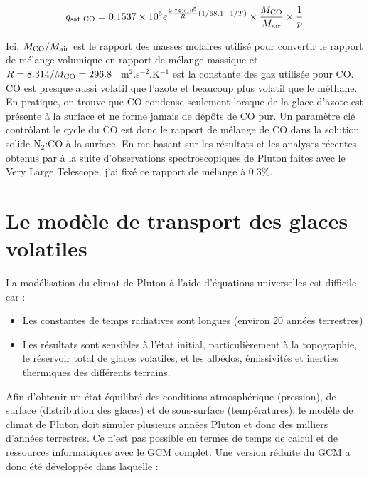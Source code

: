 \begin{equation}
\label{eq:cosat}
q_{\mbox{\scriptsize sat CO}} = 0.1537 \times 10^{5}  
e^{{\frac{2.74 \times 10^{5}}{R}} 
\left(  {1}/{68.1} -{1}/{T} \right) } 
\times \frac{M_{\mbox{\scriptsize CO}}}{M_{\mbox{\scriptsize air}}} \times \frac{1}{p}
\end{equation}

Ici, ${M_{\mbox{\scriptsize CO}}}/{M_{\mbox{\scriptsize air}}}$ est le rapport des masses molaires utilisé pour convertir le rapport de mélange volumique en rapport de mélange massique et $R = 8.314/M_{\mbox{\scriptsize CO}} = 296.8~$~m$^2$.s$^{-2}$.K$^{-1}$ est la constante des gaz utilisée pour CO. 
CO est presque aussi volatil que l’azote et beaucoup plus volatil que le méthane. En pratique, on trouve que CO condense seulement lorsque de la glace d’azote est présente à la surface et ne forme jamais de dépôts de CO pur. 
Un paramètre clé contrôlant le cycle du CO est donc le rapport de mélange de CO dans la solution solide N$_2$:CO à la surface. En me basant sur les résultats et les analyses récentes obtenus par \citet{Merl:15} à la suite d’observations spectroscopiques de Pluton faites avec le Very Large Telescope, j'ai fixé ce rapport de mélange à 0.3\%. 

\section{Le modèle de transport des glaces volatiles}
\label{sc:dev2}

La modélisation du climat de Pluton à l’aide d’équations universelles est difficile car :

\begin{itemize}
\item Les constantes de temps radiatives sont longues (environ 20 années terrestres)
\item Les résultats sont sensibles à l’état initial, particulièrement à la topographie, le réservoir total de glaces volatiles, et les albédos, émissivités et inerties thermiques des différents terrains. 
\end{itemize}

Afin d’obtenir un état équilibré des conditions atmosphérique (pression), de surface (distribution des glaces) et de sous-surface (températures), le modèle de climat de Pluton doit simuler plusieurs années Pluton et donc des milliers d’années terrestres. Ce n’est pas possible en termes de temps de calcul et de ressources informatiques avec le GCM complet. Une version réduite du GCM a donc été développée dans laquelle : 

